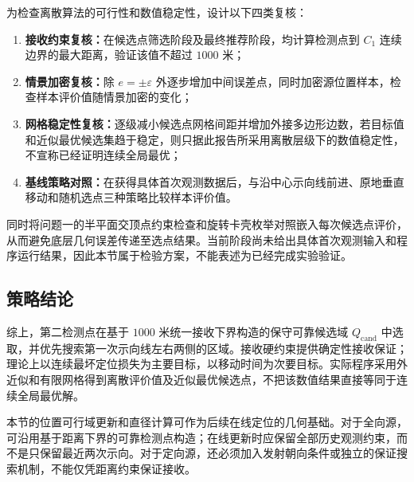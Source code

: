 为检查离散算法的可行性和数值稳定性，设计以下四类复核：
\begin{enumerate}
  \item \textbf{接收约束复核：}在候选点筛选阶段及最终推荐阶段，均计算检测点到 $C_1$ 连续边界的最大距离，验证该值不超过 $1000$ 米；
  \item \textbf{情景加密复核：}除 $e=\pm\varepsilon$ 外逐步增加中间误差点，同时加密源位置样本，检查样本评价值随情景加密的变化；
  \item \textbf{网格稳定性复核：}逐级减小候选点网格间距并增加外接多边形边数，若目标值和近似最优候选集趋于稳定，则只据此报告所采用离散层级下的数值稳定性，不宣称已经证明连续全局最优；
  \item \textbf{基线策略对照：}在获得具体首次观测数据后，与沿中心示向线前进、原地垂直移动和随机选点三种策略比较样本评价值。
\end{enumerate}
同时将问题一的半平面交顶点约束检查和旋转卡壳枚举对照嵌入每次候选点评价，从而避免底层几何误差传递至选点结果。当前阶段尚未给出具体首次观测输入和程序运行结果，因此本节属于检验方案，不能表述为已经完成实验验证。

\subsection{策略结论}

综上，第二检测点在基于 $1000$ 米统一接收下界构造的保守可靠候选域 $Q_{\mathrm{cand}}$ 中选取，并优先搜索第一次示向线左右两侧的区域。接收硬约束提供确定性接收保证；理论上以连续最坏定位损失为主要目标，以移动时间为次要目标。实际程序采用外近似和有限网格得到离散评价值及近似最优候选点，不把该数值结果直接等同于连续全局最优解。

本节的位置可行域更新和直径计算可作为后续在线定位的几何基础。对于全向源，可沿用基于距离下界的可靠检测点构造；在线更新时应保留全部历史观测约束，而不是只保留最近两次示向。对于定向源，还必须加入发射朝向条件或独立的保证搜索机制，不能仅凭距离约束保证接收。
